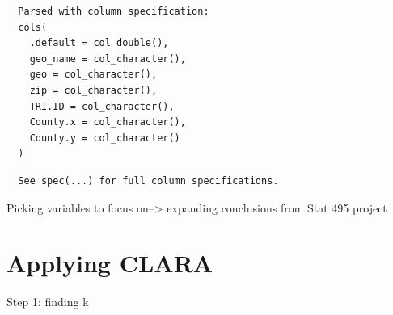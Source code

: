 \documentclass[12pt,twoside]{amherstthesis}
\begin{document}
  \begin{verbatim}
  Parsed with column specification:
  cols(
    .default = col_double(),
    geo_name = col_character(),
    geo = col_character(),
    zip = col_character(),
    TRI.ID = col_character(),
    County.x = col_character(),
    County.y = col_character()
  )
  \end{verbatim}
  
  \begin{verbatim}
  See spec(...) for full column specifications.
  \end{verbatim}
  
  \begin{Shaded}
  \begin{Highlighting}[]
  \NormalTok{(}\NormalTok{)}
  \StringTok{ }\NormalTok{data_subset[}\NormalTok{(}\OperatorTok{:}\NormalTok{,}
     \NormalTok{),]}
  \end{Highlighting}
  \end{Shaded}
  
  Picking variables to focus on--\textgreater{} expanding conclusions from
  Stat 495 project
  
  \begin{Shaded}
  \begin{Highlighting}[]
  \StringTok{ }\NormalTok{(}\NormalTok{, }\NormalTok{, }\NormalTok{, }\NormalTok{, }\NormalTok{, }\NormalTok{)}
  \StringTok{ }
  \end{Highlighting}
  \end{Shaded}
  
  \section{Applying CLARA}\label{applying-clara}
  
  Step 1: finding k
  
\end{document}
